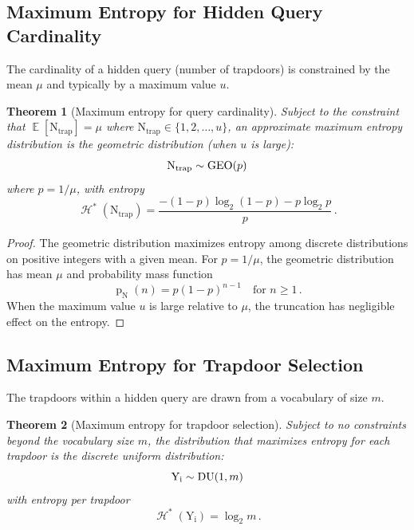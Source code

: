 \documentclass[final,11pt]{article}
\newcommand{\rv}[1]{\mathrm{#1}}
\newcommand{\entropy}{\operatorname{\mathcal{H}}}
\newcommand{\pmf}{\operatorname{p}}
\newcommand{\geodist}{\operatorname{\rm{GEO}}}
\newcommand{\dudist}{\operatorname{\rm{DU}}}
\DeclareMathOperator{\expectation}{\mathbb{E}}
\numberwithin{equation}{section}
\theoremstyle{plain}
\newtheorem{theorem}{Theorem}[section]
\theoremstyle{remark}
\begin{document}
\subsection{Maximum Entropy for Hidden Query Cardinality}
The cardinality of a hidden query (number of trapdoors) is constrained by the mean $\mu$ and typically by a maximum value $u$.

\begin{theorem}[Maximum entropy for query cardinality]
Subject to the constraint that $\expectation[\rv{N_{\text{trap}}}] = \mu$ where $\rv{N_{\text{trap}}} \in \{1, 2, \ldots, u\}$, an approximate maximum entropy distribution is the geometric distribution (when $u$ is large):
\begin{equation}
    \rv{N_{\text{trap}}} \sim \geodist(p)
\end{equation}
where $p = 1/\mu$, with entropy
\begin{equation}
    \entropy^*(\rv{N_{\text{trap}}}) = \frac{-(1-p)\log_2(1-p) - p\log_2 p}{p}\,.
\end{equation}
\end{theorem}

\begin{proof}
The geometric distribution maximizes entropy among discrete distributions on positive integers with a given mean. For $p = 1/\mu$, the geometric distribution has mean $\mu$ and probability mass function
\begin{equation}
    \pmf_{\rv{N}}(n) = p(1-p)^{n-1} \quad \text{for } n \geq 1\,.
\end{equation}
When the maximum value $u$ is large relative to $\mu$, the truncation has negligible effect on the entropy.
\end{proof}

\subsection{Maximum Entropy for Trapdoor Selection}
The trapdoors within a hidden query are drawn from a vocabulary of size $m$.

\begin{theorem}[Maximum entropy for trapdoor selection]
Subject to no constraints beyond the vocabulary size $m$, the distribution that maximizes entropy for each trapdoor is the discrete uniform distribution:
\begin{equation}
    \rv{Y_i} \sim \dudist(1, m)
\end{equation}
with entropy per trapdoor
\begin{equation}
    \entropy^*(\rv{Y_i}) = \log_2 m\,.
\end{equation}
\end{theorem}
\end{document}
